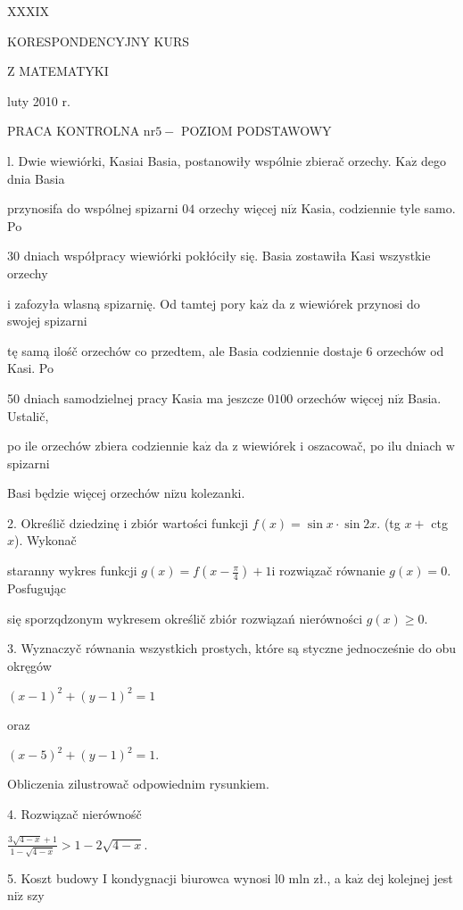 \documentclass[a4paper,12pt]{article}
\begin{document}
XXXIX

KORESPONDENCYJNY KURS

Z MATEMATYKI

luty 2010 r.

PRACA KONTROLNA $\mathrm{n}\mathrm{r} 5-$ POZIOM PODSTAWOWY

l. Dwie wiewiórki, Kasiai Basia, postanowiły wspólnie zbierač orzechy. $\mathrm{K}\mathrm{a}\dot{\mathrm{z}}$ dego dnia Basia

przynosifa do wspólnej spizarni $04$ orzechy więcej $\mathrm{n}\mathrm{i}\dot{\mathrm{z}}$ Kasia, codziennie tyle samo. Po

30 dniach współpracy wiewiórki pokłóciły się. Basia zostawiła Kasi wszystkie orzechy

$\mathrm{i}$ zafozyła wlasną spizarnię. Od tamtej pory $\mathrm{k}\mathrm{a}\dot{\mathrm{z}}$ da $\mathrm{z}$ wiewiórek przynosi do swojej spizarni

tę samą ilośč orzechów co przedtem, ale Basia codziennie dostaje 6 orzechów od Kasi. Po

50 dniach samodzielnej pracy Kasia ma jeszcze $0100$ orzechów więcej $\mathrm{n}\mathrm{i}\dot{\mathrm{z}}$ Basia. Ustalič,

po ile orzechów zbiera codziennie $\mathrm{k}\mathrm{a}\dot{\mathrm{z}}$ da $\mathrm{z}$ wiewiórek $\mathrm{i}$ oszacowač, po ilu dniach $\mathrm{w}$ spizarni

Basi będzie więcej orzechów $\mathrm{n}\mathrm{i}\dot{\mathrm{z}}\mathrm{u}$ kolezanki.

2. Określič dziedzinę $\mathrm{i}$ zbiór wartości funkcji $f(x)=\sin x\cdot\sin 2x$. (tg $x+$ ctg $x$). Wykonač

staranny wykres funkcji $g(x)=f(x-\displaystyle \frac{\pi}{4})+1\mathrm{i}$ rozwiązač równanie $g(x)=0$. Posfugując

się sporzqdzonym wykresem określič zbiór rozwiązań nierówności $g(x)\geq 0.$

3. Wyznaczyč równania wszystkich prostych, które są styczne jednocześnie do obu okręgów

$(x-1)^{2}+(y-1)^{2}=1$

oraz

$(x-5)^{2}+(y-1)^{2}=1.$

Obliczenia zilustrowač odpowiednim rysunkiem.

4. Rozwiązač nierównośč

$\displaystyle \frac{3\sqrt{4-x}+1}{1-\sqrt{4-x}}>1-2\sqrt{4-x}.$

5. Koszt budowy I kondygnacji biurowca wynosi l0 mln zł., a $\mathrm{k}\mathrm{a}\dot{\mathrm{z}}$ dej kolejnej jest $\mathrm{n}\mathrm{i}\dot{\mathrm{z}}$ szy
\end{document}
